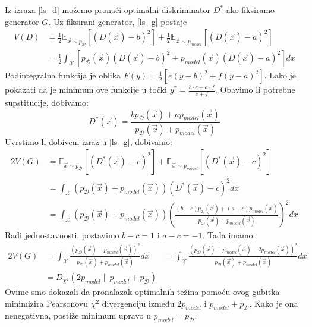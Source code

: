 Iz izraza \ref{ls_d} možemo pronaći optimalni diskriminator $D^*$ ako fiksiramo generator $G$. Uz fiksirani generator, \ref{ls_g} postaje
\begin{align}
V(D) &= \frac{1}{2}\mathbb{E}_{\vec{x} \sim p_{\mathcal{D}}}\left[(D(\vec{x}) - b)^2\right] + \frac{1}{2}\mathbb{E}_{\vec{x} \sim p_{model}}\left[(D(\vec{x}) - a)^2\right] \\
	&= \frac{1}{2} \int_{\mathcal{X}} \left[ p_{\mathcal{D}}(\vec{x})(D(\vec{x}) - b)^2 + p_{model}(\vec{x})(D(\vec{x}) - a)^2\right]dx
\end{align}
Podintegralna funkcija je oblika $F(y) = \frac{1}{2} \left[ e(y - b)^2 + f(y - a)^2\right]$. Lako je pokazati da je minimum ove funkcije u točki $y^* = \frac{b\cdot e + a \cdot f}{e + f}$. Obavimo li potrebne supstitucije, dobivamo:
\begin{equation}
D^*(\vec{x}) = \frac{bp_{\mathcal{D}}(\vec{x}) + ap_{model}(\vec{x})}{p_{\mathcal{D}}(\vec{x}) + p_{model}(\vec{x})}
\end{equation}
Uvrstimo li dobiveni izraz u \ref{ls_g}, dobivamo:
\begin{align*}
2V(G) &= \mathbb{E}_{\vec{x} \sim p_{\mathcal{D}}}\left[(D^*(\vec{x}) - c)^2\right] + \mathbb{E}_{\vec{x} \sim p_{model}}\left[(D^*(\vec{x}) - c)^2\right] \\
	&= \int_{\mathcal{X}} \left(p_{\mathcal{D}}(\vec{x}) + p_{model}(\vec{x})\right)\left(D^*(\vec{x}) - c\right)^2dx \\
	&= \int_{\mathcal{X}} \left(p_{\mathcal{D}}(\vec{x}) + p_{model}(\vec{x})\right) \left(\frac{(b - c)p_{\mathcal{D}}(\vec{x}) + (a - c)p_{model}(\vec{x})}{p_{\mathcal{D}}(\vec{x}) + p_{model}(\vec{x})}\right)^2 dx
\end{align*}
Radi jednostavnosti, postavimo $b - c = 1$ i $a - c = -1$. Tada imamo:
\begin{align*}
2V(G) &= \int_{\mathcal{X}} \frac{\left(p_{\mathcal{D}}(\vec{x}) - p_{model}(\vec{x})\right)^2}{p_{\mathcal{D}}(\vec{x}) + p_{model}(\vec{x})} dx
	&= \int_{\mathcal{X}} \frac{\left(p_{\mathcal{D}}(\vec{x}) + p_{model}(\vec{x}) - 2p_{model}(\vec{x})\right)^2}{p_{\mathcal{D}}(\vec{x}) + p_{model}(\vec{x})} dx \\
	&= D_{\chi^2}(2p_{model}\|p_{model} + p_{\mathcal{D}})
\end{align*}
Ovime smo dokazali da pronalazak optimalnih težina pomoću ovog gubitka minimizira Pearsonovu $\chi^2$ divergenciju između $2p_{model}$ i $p_{model} + p_{\mathcal{D}}$. Kako je ona nenegativna, postiže minimum upravo u $p_{model} = p_{\mathcal{D}}$.

